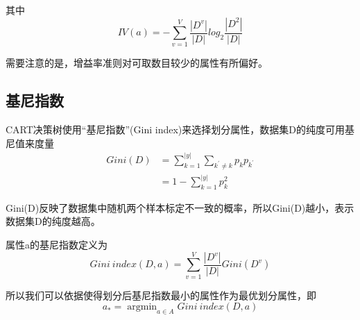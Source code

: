 \documentclass[UTF8]{article}
\begin{document}
其中
\begin{equation}
  IV(a) = -\sum_{v=1}^{V}\frac{|D^v|}{|D|} log_2 \frac{|D^2|}{|D|}
\end{equation}

需要注意的是，增益率准则对可取数目较少的属性有所偏好。
\subsection{基尼指数}
CART决策树使用“基尼指数”(Gini index)来选择划分属性，数据集D的纯度可用基尼值来度量
\begin{equation}
  \begin{split}
  Gini(D) &= \sum_{k=1}^{|y|} \sum_{k^{\prime} \neq k} p_k p_{k^{\prime}}\\
  &= 1 - \sum_{k=1}^{|y|} p_{k}^{2}
  \end{split}
\end{equation}

Gini(D)反映了数据集中随机两个样本标定不一致的概率，所以Gini(D)越小，表示数据集D的纯度越高。

属性a的基尼指数定义为
\begin{equation}
  Gini\ index(D, a) = \sum_{v=1}^V \frac{|D^v|}{|D|} Gini(D^v)
\end{equation}

所以我们可以依据使得划分后基尼指数最小的属性作为最优划分属性，即
\begin{equation}
  a_{*} = \mathop{\arg\min}_{a \in A} Gini\ index(D, a)
\end{equation}
\end{document}
